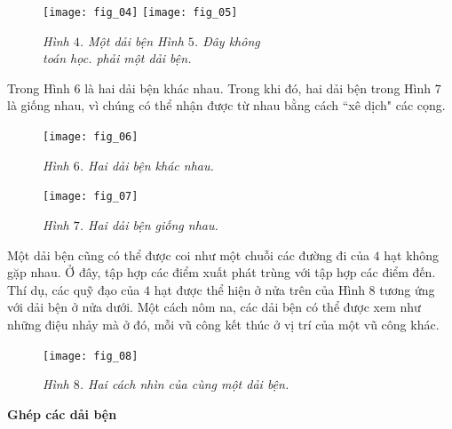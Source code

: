 \begin{multicols}{2}
	\begin{figure}[H]
		\vspace*{-7pt}
		\centering
		\captionsetup{labelformat= empty, justification=centering}
		\texttt{[image: fig\_04]}\quad
		\texttt{[image: fig\_05]}
		\caption{\small\textit{\color{duongvaotoanhoc}Hình $4$. Một dải bện \hspace*{18pt} Hình $5$. Đây không \hspace*{10pt}\\
				\hspace*{20pt}toán học.\hspace*{45pt} phải một dải bện. }}
		\vspace*{-10pt}
	\end{figure}	
	Trong Hình $6$ là hai dải bện khác nhau. Trong khi đó, hai dải bện trong Hình $7$ là giống nhau, vì chúng có thể nhận được từ nhau bằng cách ``xê dịch" các cọng.
	\begin{figure}[H]
		\vspace*{-5pt}
		\centering
		\captionsetup{labelformat= empty, justification=centering}
		\texttt{[image: fig\_06]}
		\caption{\small\textit{\color{duongvaotoanhoc}Hình $6$. Hai dải bện khác nhau.}}
		\vspace*{-5pt}
	\end{figure}
	\begin{figure}[H]
		\vspace*{5pt}
		\centering
		\captionsetup{labelformat= empty, justification=centering}
		\texttt{[image: fig\_07]}
		\caption{\small\textit{\color{duongvaotoanhoc}Hình $7$. Hai dải bện giống nhau.}}
		\vspace*{-10pt}
	\end{figure}
	Một dải bện cũng có thể được coi như một chuỗi các đường đi của $4$ hạt không gặp nhau. Ở đây, tập hợp các điểm xuất phát trùng với tập hợp các điểm đến. Thí dụ, các quỹ đạo của $4$ hạt được thể hiện ở nửa trên của Hình $8$ tương ứng với dải bện ở nửa dưới. Một cách nôm na, các dải bện có thể được xem như những điệu nhảy mà ở đó, mỗi vũ công kết thúc ở vị trí của một vũ công khác.
	\begin{figure}[H]
		\vspace*{-8pt}
		\centering
		\captionsetup{labelformat= empty, justification=centering}
		\texttt{[image: fig\_08]}
		\caption{\small\textit{\color{duongvaotoanhoc}Hình $8$. Hai cách nhìn của cùng một dải bện.}}
		\vspace*{-10pt}
	\end{figure}
	\textbf{\color{duongvaotoanhoc}Ghép các dải bện}
	\vskip 0.05cm

\end{multicols}

